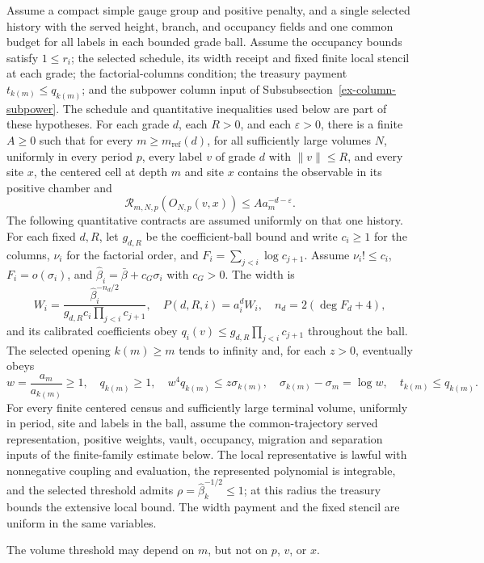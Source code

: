 \begin{theorem}\label{ex-centered-main-bound}
Assume a compact simple gauge group and positive penalty, and a single selected history with the served height, branch, and occupancy fields and one common budget for all labels in each bounded grade ball. Assume the occupancy bounds satisfy $1\leq r_i$; the selected schedule, its width receipt and fixed finite local stencil at each grade; the factorial-columns condition; the treasury payment $t_{k(m)}\leq q_{k(m)}$; and the subpower column input of Subsubsection~\ref{ex-column-subpower}. The schedule and quantitative inequalities used below are part of these hypotheses.
For each grade $d$, each $R>0$, and each $\varepsilon>0$, there is a finite $A\geq0$ such that for every $m\geq m_{\mathrm{ref}}(d)$, for all sufficiently large volumes $N$, uniformly in every period $p$, every label $v$ of grade $d$ with $\|v\|\leq R$, and every site $x$, the centered cell at depth $m$ and site $x$ contains the observable in its positive chamber and
\[
  \mathcal R_{m,N,p}(O_{N,p}(v,x))\leq A a_m^{-d-\varepsilon}.
\]
The following quantitative contracts are assumed uniformly on that one history. For each fixed $d,R$, let $g_{d,R}$ be the coefficient-ball bound and write $c_i\geq1$ for the columns, $\nu_i$ for the factorial order, and $F_i=\sum_{j<i}\log c_{j+1}$. Assume $\nu_i!\leq c_i$, $F_i=o(\sigma_i)$, and $\widehat\beta_i=\bar\beta+c_G\sigma_i$ with $c_G>0$. The width is
\[
 W_i=\frac{\widehat\beta_i^{-n_d/2}}{g_{d,R}c_i\prod_{j<i}c_{j+1}},\quad
 P(d,R,i)=a_i^d W_i,\quad n_d=2(\deg F_d+4),
\]
and its calibrated coefficients obey $q_i(v)\leq g_{d,R}\prod_{j<i}c_{j+1}$ throughout the ball. The selected opening $k(m)\geq m$ tends to infinity and, for each $z>0$, eventually obeys
\[
 w=\frac{a_m}{a_{k(m)}}\geq1,\quad q_{k(m)}\geq1,\quad
 w^4q_{k(m)}\leq z\sigma_{k(m)},\quad
 \sigma_{k(m)}-\sigma_m=\log w,\quad t_{k(m)}\leq q_{k(m)}.
\]
For every finite centered census and sufficiently large terminal volume, uniformly in period, site and labels in the ball, assume the common-trajectory served representation, positive weights, vault, occupancy, migration and separation inputs of the finite-family estimate below. The local representative is lawful with nonnegative coupling and evaluation, the represented polynomial is integrable, and the selected threshold admits $\rho=\widehat\beta_k^{-1/2}\leq1$; at this radius the treasury bounds the extensive local bound. The width payment and the fixed stencil are uniform in the same variables.

The volume threshold may depend on $m$, but not on $p$, $v$, or $x$.
\end{theorem}

